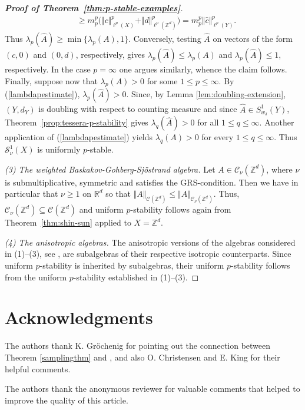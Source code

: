\documentclass{amsart}
\begin{document}
\begin{proof}[\textbf{Proof of Theorem~\ref{thm:p-stable-examples}}]
\[\begin{aligned}
 &\geq m_p^p \bigl(\Vert c\Vert_{\ell^p(X)}^p + \Vert d\Vert_{\ell^p(\mathbb{Z}^d)}^p\bigr) = m_p^p \Vert \widehat{c} \Vert_{\ell^p(Y)}^p.
\end{aligned}
\]
Thus $\lambda_p(\widehat A) \geq \min \{\lambda_p(A),1\}$. 
Conversely, testing \(\widehat A\) on vectors of the form
\((c,0)\) and \((0,d)\), respectively, gives $\lambda_p (\widehat A) \leq \lambda_p(A)$ and $\lambda_p(\widehat A)\leq1$, respectively. In the case $p=\infty$ one argues similarly, whence the claim follows. Finally, suppose now that \(\lambda_p(A)>0\) for some \(1\leq p\leq \infty\). By (\ref{lambdapestimate}), \(\lambda_p(\widehat A)>0\). Since, by Lemma \ref{lem:doubling-extension}, $(Y,d_Y)$ is doubling with respect to counting measure and since $\widehat{A} \in S^1_{w_\delta}(Y)$, Theorem~\ref{prop:tessera-p-stability} gives \(\lambda_q(\widehat A)>0\) for all \( 1 \leq q \leq \infty\). Another application of (\ref{lambdapestimate}) yields \(\lambda_q(A)>0\) for every \(1\leq q \leq \infty\). Thus \(\mathcal S^1_\nu(X)\) is uniformly $p$-stable.

\emph{(3) The weighted Baskakov-Gohberg-Sj\"ostrand algebra.}
Let \(A\in\mathcal C_\nu(\mathbb Z^d)\), where $\nu$ is submultiplicative, symmetric and satisfies the GRS-condition. Then we have in particular that $\nu \geq 1$ on $\mathbb{R}^d$ so that 
$\Vert A\Vert_{\mathcal{C}(\mathbb{Z}^d)} \leq \Vert A\Vert_{\mathcal{C}_{\nu}(\mathbb{Z}^d)}$. Thus, $     \mathcal C_\nu(\mathbb Z^d) \subseteq \mathcal C(\mathbb Z^d)$ and uniform $p$-stability follows again from Theorem~\ref{thm:shin-sun} applied to $X=\mathbb{Z}^d$.

\emph{(4) The anisotropic algebras.}
The anisotropic versions of the algebras considered in (1)--(3), see \cite[Section~6]{KoeBa25}, are subalgebras of their respective isotropic counterparts. Since uniform $p$-stability is inherited by subalgebras, their uniform $p$-stability follows from the uniform $p$-stability established in
(1)--(3).
\end{proof}

\section*{Acknowledgments}

\noindent The authors thank K. Gr\"ochenig for pointing out the connection between Theorem \ref{samplingthm} and \cite{grrost18}, and also  O. Christensen and E. King for their helpful comments.

The authors thank the anonymous reviewer for valuable comments that helped to improve the quality of this article.
\end{document}
